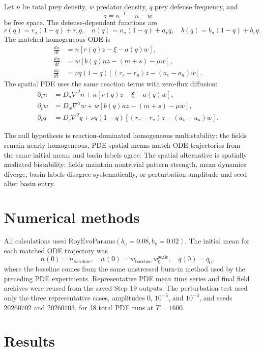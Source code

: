 \documentclass[11pt]{article}
\begin{document}
Let \(n\) be total prey density, \(w\) predator density, \(q\) prey defense frequency, and
\[
z=\kappa^{-1}-n-w
\]
be free space. The defense-dependent functions are
\[
r(q)=r_u(1-q)+r_vq,\quad
a(q)=a_u(1-q)+a_vq,\quad
b(q)=b_u(1-q)+b_vq.
\]
The matched homogeneous ODE is
\begin{align}
\frac{dn}{dt} &= n\left[r(q)z-\xi-a(q)w\right],\\
\frac{dw}{dt} &= w\left[b(q)nz-(m+s)-\mu w\right],\\
\frac{dq}{dt} &= \nu q(1-q)\left[(r_v-r_u)z-(a_v-a_u)w\right].
\end{align}
The spatial PDE uses the same reaction terms with zero-flux diffusion:
\begin{align}
\partial_t n &= D_n\nabla^2 n+n\left[r(q)z-\xi-a(q)w\right],\\
\partial_t w &= D_w\nabla^2 w+w\left[b(q)nz-(m+s)-\mu w\right],\\
\partial_t q &= D_q\nabla^2 q+\nu q(1-q)\left[(r_v-r_u)z-(a_v-a_u)w\right].
\end{align}

The null hypothesis is reaction-dominated homogeneous multistability: the fields remain nearly homogeneous, PDE spatial means match ODE trajectories from the same initial mean, and basin labels agree. The spatial alternative is spatially mediated bistability: fields maintain nontrivial pattern strength, mean dynamics diverge, basin labels disagree systematically, or perturbation amplitude and seed alter basin entry.

\section{Numerical methods}

All calculations used \(\mathrm{RoyEvoParams}(b_u=0.08,b_v=0.02)\). The initial mean for each matched ODE trajectory was
\[
n(0)=n_\mathrm{baseline},\quad
w(0)=w_\mathrm{baseline}\,w_0^\mathrm{scale},\quad
q(0)=q_0,
\]
where the baseline comes from the same unstressed burn-in method used by the preceding PDE experiments. Representative PDE mean time series and final field archives were reused from the saved Step 19 outputs. The perturbation test used only the three representative cases, amplitudes \(0\), \(10^{-5}\), and \(10^{-3}\), and seeds 20260702 and 20260703, for 18 total PDE runs at \(T=1600\).

\section{Results}
\end{document}
